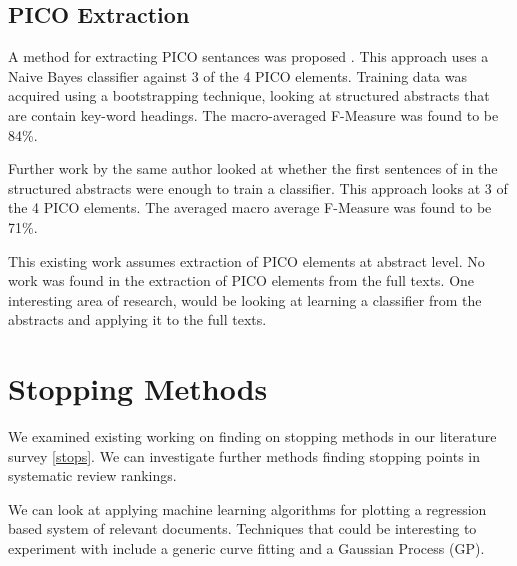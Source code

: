 \subsection{PICO Extraction} \label{picoExtr}

A method for extracting PICO sentances was proposed \cite{Huang2011}. This approach uses a Naive Bayes classifier against 3 of the 4 PICO elements. Training data was acquired using a bootstrapping technique, looking at structured abstracts that are contain key-word headings. The macro-averaged F-Measure was found to be 84\%.

Further work \cite{HUAN2013} by the same author looked at whether the first sentences of in the structured abstracts were enough to train a classifier. This approach looks at 3 of the 4 PICO elements. The averaged macro average F-Measure was found to be 71\%.

This existing work assumes extraction of PICO elements at abstract level. No work was found \cite{Jonnalagadda2015} in the extraction of PICO elements from the full texts. One interesting area of research, would be looking at learning a classifier from the abstracts and applying it to the full texts.



\section{Stopping Methods} \label{sm}

We examined existing working on finding on stopping methods in our literature survey \ref{stops}. We can investigate further methods finding stopping points in systematic review rankings. 

We can look at applying machine learning algorithms for plotting a regression based system of relevant documents. Techniques that could be interesting to experiment with include a generic curve fitting and a Gaussian Process (GP).
